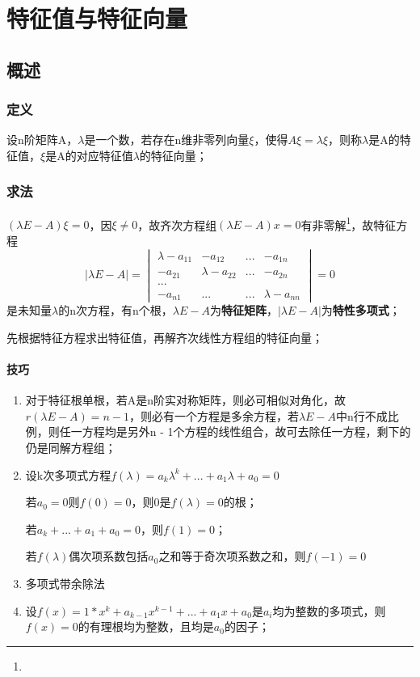 
\chapter{特征值与特征向量}

\section{概述}

\subsection{定义}
设n阶矩阵A，\(\lambda\)是一个数，若存在n维非零列向量\(\xi\)，使得\(A\xi = \lambda\xi\)，则称\(\lambda\)是A的特征值，\(\xi\)是A的对应特征值\(\lambda\)的特征向量；

\subsection{求法}
\((\lambda E - A)\xi = 0\)，因\(\xi \neq 0\)，故齐次方程组\((\lambda E - A)x = 0\)有非零解\footnote[1]{\mymatrix}，故特征方程\[|\lambda E - A| = \begin{vmatrix}
\lambda - a_{11} & -a_{12} & ... & -a_{1n} \\ 
-a_{21} & \lambda - a_{22} & ... & -a_{2n} \\
... \\ 
-a_{n1} & ... & ... & \lambda - a_{nn}
\end{vmatrix} = 0\]是未知量\(\lambda\)的n次方程，有n个根，\(\lambda E - A\)为\textbf{特征矩阵}，\(|\lambda E - A|\)为\textbf{特性多项式}；

先根据特征方程求出特征值，再解齐次线性方程组的特征向量；

\subsubsection{技巧}
\begin{enumerate}
    \item 对于特征根单根，若A是n阶实对称矩阵，则必可相似对角化，故\(r(\lambda E - A) = n - 1\)，则必有一个方程是多余方程，若\(\lambda E - A\)中n行不成比例，则任一方程均是另外n - 1个方程的线性组合，故可去除任一方程，剩下的仍是同解方程组；
    \item 设k次多项式方程\(f(\lambda) = a_k\lambda^k + ... + a_1\lambda + a_0 = 0\)

    若\(a_0 = 0\)则\(f(0) = 0\)，则0是\(f(\lambda) = 0\)的根；

    若\(a_k + ... + a_1 + a_0 = 0\)，则\(f(1) = 0\)；

    若\(f(\lambda)\)偶次项系数包括\(a_0\)之和等于奇次项系数之和，则\(f(-1) = 0\)
    \item 多项式带余除法
    \item 设\(f(x) = 1 * x^k + a_{k - 1}x^{k - 1} + ... + a_1x + a_0\)是\(a_i\)均为整数的多项式，则\(f(x) = 0\)的有理根均为整数，且均是\(a_0\)的因子；
\end{enumerate}



